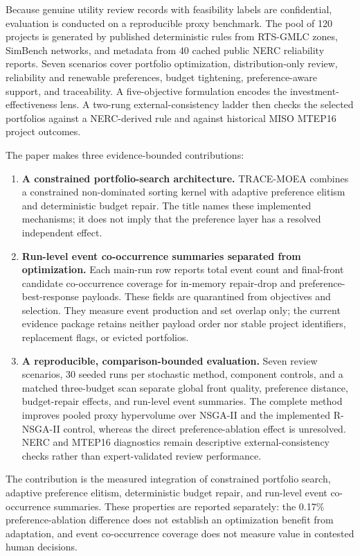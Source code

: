 \documentclass[
  10pt,
  a4paper,
]{article}
\begin{document}
Because genuine utility review records with feasibility labels are
confidential, evaluation is conducted on a reproducible proxy benchmark.
The pool of 120 projects is generated by published deterministic rules
from RTS-GMLC zones, SimBench networks, and metadata from 40 cached
public NERC reliability reports. Seven scenarios cover portfolio
optimization, distribution-only review, reliability and renewable
preferences, budget tightening, preference-aware support, and
traceability. A five-objective formulation encodes the
investment-effectiveness lens. A two-rung external-consistency ladder
then checks the selected portfolios against a NERC-derived rule and
against historical MISO MTEP16 project outcomes.

The paper makes three evidence-bounded contributions:

\begin{enumerate}
\def\labelenumi{\arabic{enumi}.}
\item
  \textbf{A constrained portfolio-search architecture.} TRACE-MOEA
  combines a constrained non-dominated sorting kernel with adaptive
  preference elitism and deterministic budget repair. The title names
  these implemented mechanisms; it does not imply that the preference
  layer has a resolved independent effect.
\item
  \textbf{Run-level event co-occurrence summaries separated from
  optimization.} Each main-run row reports total event count and
  final-front candidate co-occurrence coverage for in-memory repair-drop
  and preference-best-response payloads. These fields are quarantined
  from objectives and selection. They measure event production and set
  overlap only; the current evidence package retains neither payload
  order nor stable project identifiers, replacement flags, or evicted
  portfolios.
\item
  \textbf{A reproducible, comparison-bounded evaluation.} Seven review
  scenarios, 30 seeded runs per stochastic method, component controls,
  and a matched three-budget scan separate global front quality,
  preference distance, budget-repair effects, and run-level event
  summaries. The complete method improves pooled proxy hypervolume over
  NSGA-II and the implemented R-NSGA-II control, whereas the direct
  preference-ablation effect is unresolved. NERC and MTEP16 diagnostics
  remain descriptive external-consistency checks rather than
  expert-validated review performance.
\end{enumerate}

The contribution is the measured integration of constrained portfolio
search, adaptive preference elitism, deterministic budget repair, and
run-level event co-occurrence summaries. These properties are reported
separately: the 0.17\% preference-ablation difference does not establish
an optimization benefit from adaptation, and event co-occurrence
coverage does not measure value in contested human decisions.
\end{document}
